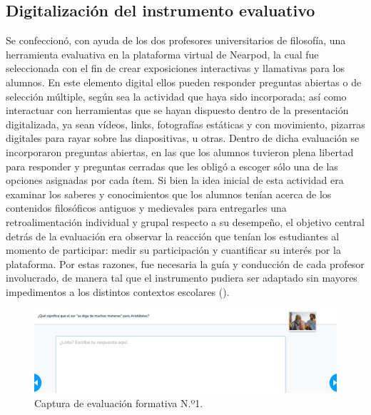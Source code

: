 \documentclass[spanish]{textolivre}
\begin{document}
\subsection{Digitalización del instrumento evaluativo}
Se confeccionó, con ayuda de los dos profesores universitarios de filosofía, una herramienta evaluativa en la plataforma virtual de Nearpod, la cual fue seleccionada con el fin de crear exposiciones interactivas y llamativas para los alumnos. En este elemento digital ellos pueden responder preguntas abiertas o de selección múltiple, según sea la actividad que haya sido incorporada; así como interactuar con herramientas que se hayan dispuesto dentro de la presentación digitalizada, ya sean vídeos, links, fotografías estáticas y con movimiento, pizarras digitales para rayar sobre las diapositivas, u otras. Dentro de dicha evaluación se incorporaron preguntas abiertas, en las que los alumnos tuvieron plena libertad para responder y preguntas cerradas que les obligó a escoger sólo una de las opciones asignadas por cada ítem. Si bien la idea inicial de esta actividad era examinar los saberes y conocimientos que los alumnos tenían acerca de los contenidos filosóficos antiguos y medievales para entregarles una retroalimentación individual y grupal respecto a su desempeño, el objetivo central detrás de la evaluación era observar la reacción que tenían los estudiantes al momento de participar: medir su participación y cuantificar su interés por la plataforma. Por estas razones, fue necesaria la guía y conducción de cada profesor involucrado, de manera tal que el instrumento pudiera ser adaptado sin mayores impedimentos a los distintos contextos escolares (). 

\begin{figure}[h!]
    \centering
    \begin{minipage}{0.77\linewidth}
    \includegraphics[width=\linewidth]{imagens/image1.png}
    \caption{Captura de evaluación formativa N.º1.}
    \label{fig-1}
    \end{minipage}
\end{figure}
\end{document}
